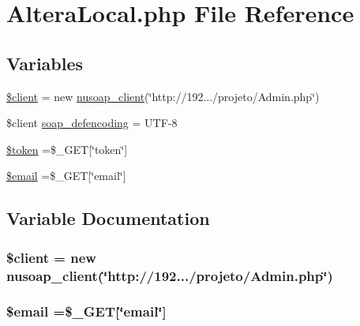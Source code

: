 \hypertarget{_altera_local_8php}{}\section{Altera\+Local.\+php File Reference}
\label{_altera_local_8php}
\subsection*{Variables}
\begin{DoxyCompactItemize}
\item 
\hyperlink{_altera_local_8php_ad1405dc1ba2e288764378e79bff7a87d}{\$client} = new \hyperlink{classnusoap__client}{nusoap\+\_\+client}(\char`\"{}http\+://192.../projeto/Admin.\+php\char`\"{})
\item 
\$client \hyperlink{_altera_local_8php_a944cce1b9c1aa5e93c77ace20ce99989}{soap\+\_\+defencoding} = \textquotesingle{}U\+T\+F-\/8\textquotesingle{}
\item 
\hyperlink{_altera_local_8php_a00ae4fcafb1145f5e968bdf920f83e2e}{\$token} =\$\+\_\+\+G\+E\+T\mbox{[}\char`\"{}token\char`\"{}\mbox{]}
\item 
\hyperlink{_altera_local_8php_ad634f418b20382e2802f80532d76d3cd}{\$email} =\$\+\_\+\+G\+E\+T\mbox{[}\char`\"{}email\char`\"{}\mbox{]}
\end{DoxyCompactItemize}


\subsection{Variable Documentation}
\hypertarget{_altera_local_8php_ad1405dc1ba2e288764378e79bff7a87d}{}
\subsubsection[{\$client}]{\setlength{\rightskip}{0pt plus 5cm}\$client = new {\bf nusoap\+\_\+client}(\char`\"{}http\+://192.../projeto/Admin.\+php\char`\"{})}\label{_altera_local_8php_ad1405dc1ba2e288764378e79bff7a87d}
\hypertarget{_altera_local_8php_ad634f418b20382e2802f80532d76d3cd}{}
\subsubsection[{\$email}]{\setlength{\rightskip}{0pt plus 5cm}\$email =\$\+\_\+\+G\+E\+T\mbox{[}\char`\"{}email\char`\"{}\mbox{]}}\label{_altera_local_8php_ad634f418b20382e2802f80532d76d3cd}
\hypertarget{_altera_local_8php_a00ae4fcafb1145f5e968bdf920f83e2e}{}
